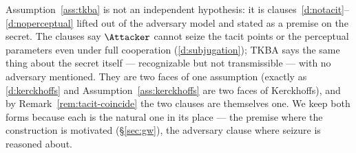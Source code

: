 \begin{remark}\label{rem:tkba-restates}
Assumption~\ref{ass:tkba} is not an independent hypothesis: it is
clauses~\ref{d:notacit}--\ref{d:noperceptual} lifted out of the adversary model and
stated as a premise on the secret. The clauses say $\Attacker$ cannot seize the
tacit points or the perceptual parameters even under full cooperation
(\ref{d:subjugation}); TKBA says the same thing about the secret itself ---
recognizable but not transmissible --- with no adversary mentioned. They are two
faces of one assumption (exactly as \ref{d:kerckhoffs} and
Assumption~\ref{ass:kerckhoffs} are two faces of Kerckhoffs), and by
Remark~\ref{rem:tacit-coincide} the two clauses are themselves one. We keep both
forms because each is the natural one in its place --- the premise where the
construction is motivated (\S\ref{sec:gw}), the adversary clause where seizure is
reasoned about.
\end{remark}

